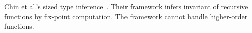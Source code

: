 Chin et al.'s sized type inference~\cite{Chin2003}.  Their framework
infers invariant of recursive functions by fix-point computation.  The
framework cannot handle higher-order functions.

